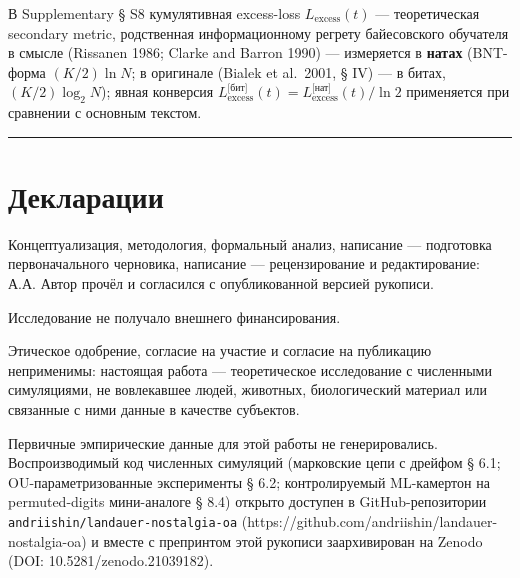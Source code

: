 \documentclass[pdflatex,sn-mathphys-ay]{sn-jnl}
\begin{document}
В Supplementary § S8 кумулятивная excess-loss \(L_{\text{excess}}(t)\) --- теоретическая secondary metric, родственная информационному регрету байесовского обучателя в смысле (Rissanen 1986; Clarke and Barron 1990) --- измеряется в \textbf{натах} (BNT-форма \((K/2)\ln N\); в оригинале (Bialek et al.~2001, § IV) --- в битах, \((K/2)\log_2 N\)); явная конверсия \(L_{\text{excess}}^{\text{[бит]}}(t) = L_{\text{excess}}^{\text{[нат]}}(t)/\ln 2\) применяется при сравнении с основным текстом.



\begin{center}\rule{0.5\linewidth}{0.5pt}\end{center}



\backmatter

\section*{Декларации}

Концептуализация, методология, формальный анализ, написание --- подготовка первоначального черновика, написание --- рецензирование и редактирование: А.А. Автор прочёл и согласился с опубликованной версией рукописи.

Исследование не получало внешнего финансирования.

Этическое одобрение, согласие на участие и согласие на публикацию неприменимы: настоящая работа --- теоретическое исследование с численными симуляциями, не вовлекавшее людей, животных, биологический материал или связанные с ними данные в качестве субъектов.

Первичные эмпирические данные для этой работы не генерировались. Воспроизводимый код численных симуляций (марковские цепи с дрейфом § 6.1; OU-параметризованные эксперименты § 6.2; контролируемый ML-камертон на permuted-digits мини-аналоге § 8.4) открыто доступен в GitHub-репозитории \texttt{andriishin/landauer-nostalgia-oa} (https://github.com/andriishin/landauer-nostalgia-oa) и вместе с препринтом этой рукописи заархивирован на Zenodo (DOI: 10.5281/zenodo.21039182).
\end{document}
